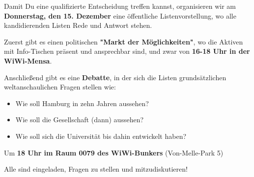 \documentclass[a4paper,ngerman,headheight=80pt,12pt,DIV=calc]{scrartcl}
\begin{document}
    Damit Du eine qualifizierte Entscheidung treffen kannst, organisieren wir
    am \textbf{Donnerstag, den 15. Dezember} eine öffentliche Listenvorstellung,
    wo alle kandidierenden Listen Rede und Antwort stehen.

    Zuerst gibt es einen politischen \textbf{"Markt der Möglichkeiten"}, wo die Aktiven
    mit Info-Tischen präsent und ansprechbar sind, und zwar von \textbf{16-18 Uhr
    in der WiWi-Mensa}.

    Anschließend gibt es eine \textbf{Debatte}, in der sich die Listen grundsätzlichen
    weltanschaulichen Fragen stellen wie:

    \begin{itemize}
        \item Wie soll Hamburg in zehn Jahren aussehen?
        \item Wie soll die Gesellschaft (dann) aussehen?
        \item Wie soll sich die Universität bis dahin entwickelt haben?
    \end{itemize}

    Um \textbf{18 Uhr im Raum 0079 des WiWi-Bunkers} (Von-Melle-Park 5)

    Alle sind eingeladen, Fragen zu stellen und mitzudiskutieren!
\end{document}
